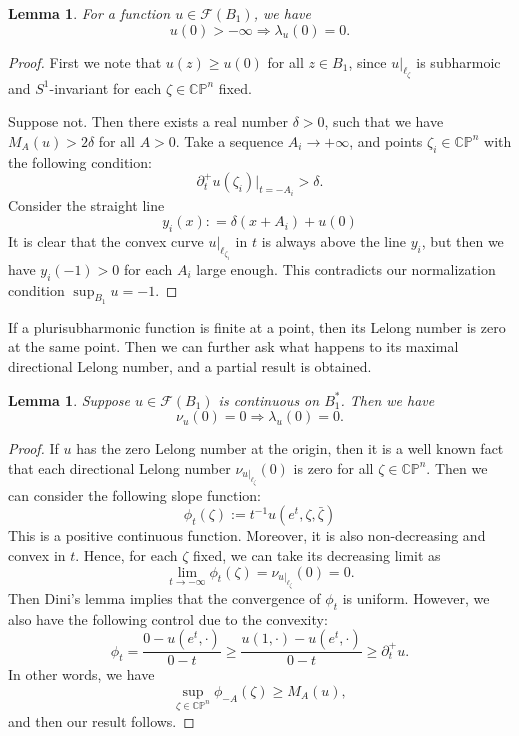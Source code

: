 \documentclass[a4paper,11pt]{amsart}
\numberwithin{equation}{section}
\newtheorem{lemma}[theorem]{Lemma}
\def\d{\partial}
\def\cF{{\mathcal F}}
\def\bC{{\mathbb C}}
\def\bP{{\mathbb P}}
\def\z{{\zeta}}
\def\l{{\ell}}
\begin{document}
\begin{lemma}
\label{lem-cs-001}
For a function $u\in \cF(B_1)$, we have 
$$  u(0) > -\infty \Rightarrow \lambda_u(0) =0. $$
\end{lemma}
\begin{proof}
First we note that $u(z)\geq u(0)$ 
for all $z\in B_1$, since $u|_{\l_{\z}}$ is subharmoic and $S^1$-invariant
for each $\z\in \bC\bP^n$ fixed. 

Suppose not. 
Then there exists a real number $\delta >0$,
such that we have $M_A (u) > 2\delta$ for all $A>0$. 
Take a sequence $A_i \rightarrow +\infty$, 
and points $\z_i \in \bC\bP^n$ with the following condition: 
$$ \d_t^+ u(\z_i) |_{t = -A_i} > \delta.  $$
Consider the straight line 
$$ y_i(x): = \delta (x + A_i ) + u(0)  $$
It is clear that the convex curve $u|_{\l_{\z_i}}$ in $t$ is always above the line $y_i$, 
but then we have $y_i (-1) >0 $ for each $A_i$ large enough. 
This contradicts our normalization condition $\sup_{B_1} u = -1$. 


\end{proof}

If a plurisubharmonic function is finite at a point, 
then its Lelong number is zero at the same point.  
Then we can further ask what happens to its maximal directional Lelong number, 
and a partial result is obtained.

\begin{lemma}
\label{lem-cs-002}
Suppose $u\in \cF(B_1)$ is continuous on $B^*_1$. 
Then we have 
$$ \nu_u(0) =0 \Rightarrow \lambda_u(0) =0.  $$
\end{lemma}
\begin{proof}
If $u$ has the zero Lelong number at the origin, 
then it is a well known fact that each directional Lelong number $\nu_{u|_{\l_{\z}}} (0)$ 
is zero for all $\z\in \bC\bP^n$. 
Then we can consider the following slope function:
\begin{equation}
\label{cs-001}
\phi_t (\z):=           t^{-1} u(e^t, \z, \bar\z)
\end{equation} 
This is a positive continuous function. 
Moreover, 
it is also non-decreasing and convex in $t$. 
Hence, for each $\z$ fixed,  we can take its decreasing limit as   
\begin{equation}
\label{cs-002}
\lim_{t \rightarrow -\infty} \phi_t (\z) = \nu_{u|_{\l_{\z}}} (0) =0. 
\end{equation} 
Then Dini's lemma implies that the convergence of $\phi_t$
is uniform. However, we also have the following control due to the convexity: 
\begin{equation}
\label{cs-003}
\phi_t = \frac{ 0 - u(e^t, \cdot)}{ 0 -t } \geq  \frac{ u(1, \cdot) - u(e^t, \cdot) }{0 -t} \geq \d^+_t u. 
\end{equation} 
In other words, we have 
$$ \sup_{\z\in \bC\bP^n} \phi_{-A} (\z) \geq  M_A (u), $$
and then our result follows. 
\end{proof}
\end{document}
